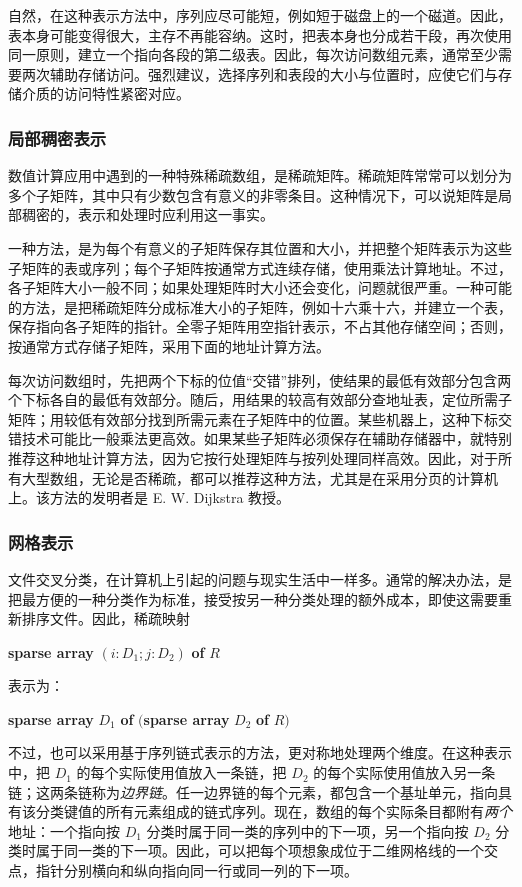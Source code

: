 自然，在这种表示方法中，序列应尽可能短，例如短于磁盘上的一个磁道。因此，表本身可能变得很大，主存不再能容纳。这时，把表本身也分成若干段，再次使用同一原则，建立一个指向各段的第二级表。因此，每次访问数组元素，通常至少需要两次辅助存储访问。强烈建议，选择序列和表段的大小与位置时，应使它们与存储介质的访问特性紧密对应。

\subsubsection{局部稠密表示}

数值计算应用中遇到的一种特殊稀疏数组，是稀疏矩阵。稀疏矩阵常常可以划分为多个子矩阵，其中只有少数包含有意义的非零条目。这种情况下，可以说矩阵是局部稠密的，表示和处理时应利用这一事实。

一种方法，是为每个有意义的子矩阵保存其位置和大小，并把整个矩阵表示为这些子矩阵的表或序列；每个子矩阵按通常方式连续存储，使用乘法计算地址。不过，各子矩阵大小一般不同；如果处理矩阵时大小还会变化，问题就很严重。一种可能的方法，是把稀疏矩阵分成标准大小的子矩阵，例如十六乘十六，并建立一个表，保存指向各子矩阵的指针。全零子矩阵用空指针表示，不占其他存储空间；否则，按通常方式存储子矩阵，采用下面的地址计算方法。

每次访问数组时，先把两个下标的位值“交错”排列，使结果的最低有效部分包含两个下标各自的最低有效部分。随后，用结果的较高有效部分查地址表，定位所需子矩阵；用较低有效部分找到所需元素在子矩阵中的位置。某些机器上，这种下标交错技术可能比一般乘法更高效。如果某些子矩阵必须保存在辅助存储器中，就特别推荐这种地址计算方法，因为它按行处理矩阵与按列处理同样高效。因此，对于所有大型数组，无论是否稀疏，都可以推荐这种方法，尤其是在采用分页的计算机上。该方法的发明者是 E. W. Dijkstra 教授。

\subsubsection{网格表示}

文件交叉分类，在计算机上引起的问题与现实生活中一样多。通常的解决办法，是把最方便的一种分类作为标准，接受按另一种分类处理的额外成本，即使这需要重新排序文件。因此，稀疏映射

\quad \textbf{sparse array} $(i:D_1; j:D_2)$ \textbf{of} $R$

\noindent
表示为：

\quad \textbf{sparse array} $D_1$ \textbf{of} $($\textbf{sparse array} $D_2$ \textbf{of} $R)$

不过，也可以采用基于序列链式表示的方法，更对称地处理两个维度。在这种表示中，把 $D_1$ 的每个实际使用值放入一条链，把 $D_2$ 的每个实际使用值放入另一条链；这两条链称为\textit{边界链}。任一边界链的每个元素，都包含一个基址单元，指向具有该分类键值的所有元素组成的链式序列。现在，数组的每个实际条目都附有\textit{两个}地址：一个指向按 $D_1$ 分类时属于同一类的序列中的下一项，另一个指向按 $D_2$ 分类时属于同一类的下一项。因此，可以把每个项想象成位于二维网格线的一个交点，指针分别横向和纵向指向同一行或同一列的下一项。

